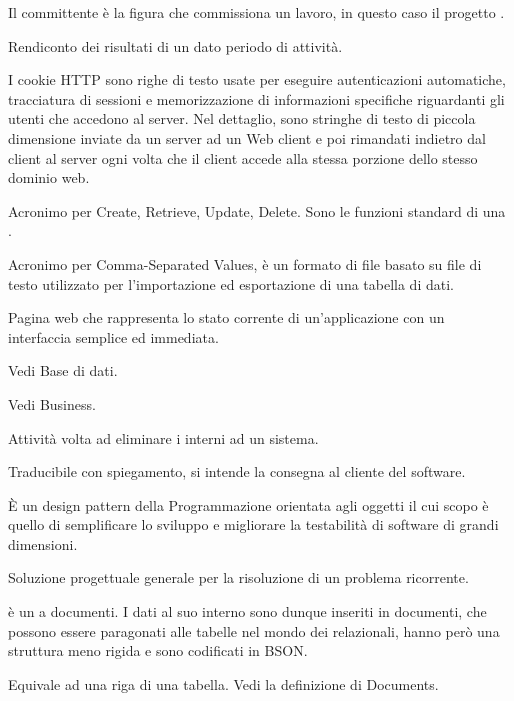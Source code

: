 Il committente è la figura che commissiona un lavoro, in questo caso il progetto \ProjectName{}.

Rendiconto  dei risultati di un dato periodo di attività.

I cookie HTTP sono righe di testo usate per eseguire autenticazioni automatiche, tracciatura di sessioni e memorizzazione di informazioni specifiche riguardanti gli utenti che accedono al server. Nel dettaglio, sono stringhe di testo di piccola dimensione inviate da un server ad un Web client e poi rimandati indietro dal client al server ogni volta che il client accede alla stessa porzione dello stesso dominio web.

Acronimo per Create, Retrieve, Update, Delete. Sono le funzioni standard di una .

Acronimo per Comma-Separated Values, è un formato di file basato su file di testo utilizzato per l'importazione ed esportazione di una tabella di dati.


Pagina web che rappresenta lo stato corrente di un'applicazione con un interfaccia semplice ed immediata.

Vedi Base di dati.

Vedi Business.

Attività volta ad eliminare i  interni ad un sistema. 

Traducibile con spiegamento, si intende la consegna al cliente del software.

\`E un design pattern della Programmazione orientata agli oggetti il cui scopo è quello di semplificare lo sviluppo e migliorare la testabilità di software di grandi dimensioni.

Soluzione progettuale generale per la risoluzione di un problema ricorrente.

 è un  a documenti. I dati al suo interno sono dunque inseriti in documenti, che possono essere paragonati alle tabelle nel mondo dei  relazionali, hanno però una struttura meno rigida e sono codificati in BSON.

Equivale ad una riga di una tabella. Vedi la definizione di Documents.

